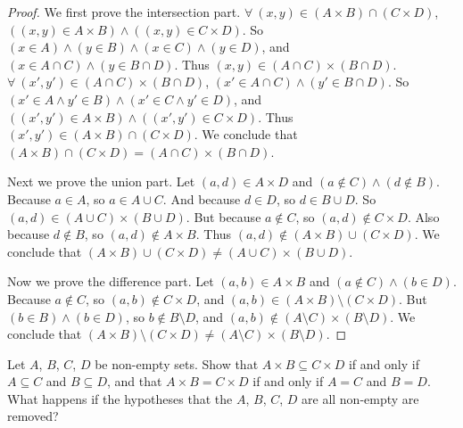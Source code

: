 \begin{proof}
We first prove the intersection part.
\(\forall\ (x, y) \in (A \times B) \cap (C \times D)\), \(((x, y) \in A \times B) \land ((x, y) \in C \times D)\).
So \((x \in A) \land (y \in B) \land (x \in C) \land (y \in D)\), and \((x \in A \cap C) \land (y \in B \cap D)\).
Thus \((x, y) \in (A \cap C) \times (B \cap D)\).
\(\forall\ (x', y') \in (A \cap C) \times (B \cap D)\), \((x' \in A \cap C) \land (y' \in B \cap D)\).
So \((x' \in A \land y' \in B) \land (x' \in C \land y' \in D)\), and \(((x', y') \in A \times B) \land ((x', y') \in C \times D)\).
Thus \((x', y') \in (A \times B) \cap (C \times D)\).
We conclude that \((A \times B) \cap (C \times D) = (A \cap C) \times (B \cap D)\).

Next we prove the union part.
Let \((a, d) \in A \times D\) and \((a \notin C) \land (d \notin B)\).
Because \(a \in A\), so \(a \in A \cup C\).
And because \(d \in D\), so \(d \in B \cup D\).
So \((a, d) \in (A \cup C) \times (B \cup D)\).
But because \(a \notin C\), so \((a, d) \notin C \times D\).
Also because \(d \notin B\), so \((a, d) \notin A \times B\).
Thus \((a, d) \notin (A \times B) \cup (C \times D)\).
We conclude that \((A \times B) \cup (C \times D) \neq (A \cup C) \times (B \cup D)\).

Now we prove the difference part.
Let \((a, b) \in A \times B\) and \((a \notin C) \land (b \in D)\).
Because \(a \notin C\), so \((a, b) \notin C \times D\), and \((a, b) \in (A \times B) \setminus (C \times D)\).
But \((b \in B) \land (b \in D)\), so \(b \notin B \setminus D\), and \((a, b) \notin (A \setminus C) \times (B \setminus D)\).
We conclude that \((A \times B) \setminus (C \times D) \neq (A \setminus C) \times (B \setminus D)\).
\end{proof}

\begin{exercise}\label{ex 3.5.6}
Let \(A\), \(B\), \(C\), \(D\) be non-empty sets.
Show that \(A \times B \subseteq C \times D\) if and only if \(A \subseteq C\) and \(B \subseteq D\), and that \(A \times B = C \times D\) if and only if \(A = C\) and \(B = D\).
What happens if the hypotheses that the \(A\), \(B\), \(C\), \(D\) are all non-empty are removed?
\end{exercise}

